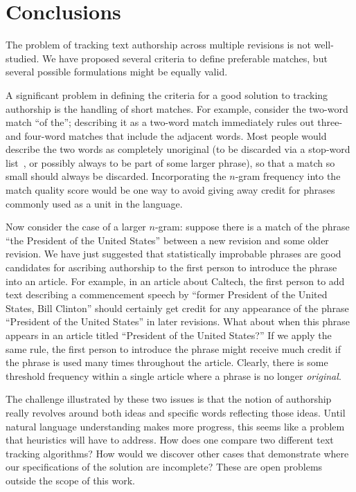 \section{Conclusions}

The problem of tracking text authorship across multiple revisions
is not well-studied.
We have proposed several criteria to define preferable matches,
but several possible formulations
might be equally valid.

A significant problem in defining the criteria for a
good solution to tracking authorship is the handling of short matches.
For example, consider the two-word match ``of the''; describing
it as a two-word match immediately rules out three- and four-word
matches that include the adjacent words.
Most people would describe the two words as completely
unoriginal (to be discarded via a stop-word list~\cite{Kinzler2011},
or possibly always to be part of some larger phrase),
so that a match so small should always be discarded.
Incorporating the $n$-gram frequency into the match quality
score would be one way to avoid giving away credit for phrases
commonly used as a unit in the language.

Now consider the case of a larger $n$-gram: suppose there is a match
of the phrase ``the President of the United States'' between a new
revision and some older revision.
We have just suggested that statistically improbable phrases are
good candidates for ascribing authorship to the first person to
introduce the phrase into an article.
For example, in an article about Caltech, the first person to
add text describing a commencement speech by ``former President of
the United States, Bill Clinton'' should certainly get credit for
any appearance of the phrase ``President of the United States''
in later revisions.
What about when this phrase appears in an article titled
``President of the United States?''
If we apply the same rule, the first person to introduce the phrase
might receive much credit if the phrase is used many times throughout
the article.
Clearly, there is some threshold frequency within a single
article where a phrase is no longer \textit{original}.

The challenge illustrated by these two issues is that the notion
of authorship really revolves around both ideas and specific
words reflecting those ideas.
Until natural language understanding makes more progress, this seems
like a problem that heuristics will have to address.
How does one compare two different text tracking algorithms?
How would we discover other cases that demonstrate where our
specifications of the solution are incomplete?
These are open problems outside the scope of this work.

